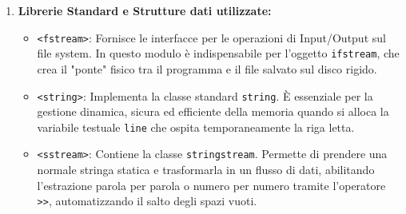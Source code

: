 \documentclass[12pt, a4paper]{article}
\begin{document}
\begin{enumerate}
\begin{itemize}
        \item[-] Sostituzione dinamica dei delimitatori testuali \texttt{|} con spazi bianchi nella seconda parola (\texttt{sequenza\_as}) tramite l'algoritmo \texttt{replace}, preparando la stringa per la successiva estrazione numerica diretta.
        \item[-] Usando nuovamente un oggetto \texttt{stringstream ss\_numeri(sequenza\_as)}, si trasforma la seconda parola modificata in un nuovo stream per leggere la sequenza degli AS.
        \item[-] Inizializzazione delle variabili intere $u$ e $v$. Queste sono utilizzate per mantenere in memoria due numeri consecutivi durante la lettura. La variabile $u$ viene inizializzata a -1 per indicare che non è ancora stata completata la lettura della prima coppia.
        \item[-] Lettura sequenziale dei numeri tramite l'operatore \texttt{>>} all'interno del ciclo \texttt{while (ss\_numeri >> v)}, salvando il valore estratto in $v$. Successivamente si verifica che $u$ sia diverso da -1 e che $u$ e $v$ siano tra loro diversi (per prevenire i self-loop). Se le condizioni sono soddisfatte, l'arco $(u, v)$ viene inserito nel Grafo. Infine, si pone $u = v$ per passare alla coppia di valori successiva.
        \item[-] Chiusura del file al termine della scansione tramite il metodo \texttt{file.close()}.
    \end{itemize}
    \item \textbf{Librerie Standard e Strutture dati utilizzate:}
    \begin{itemize}
        \item[-] \texttt{<fstream>}: Fornisce le interfacce per le operazioni di Input/Output sul file system. In questo modulo è indispensabile per l'oggetto \texttt{ifstream}, che crea il "ponte" fisico tra il programma e il file salvato sul disco rigido.
        \item[-] \texttt{<string>}: Implementa la classe standard \texttt{string}. È essenziale per la gestione dinamica, sicura ed efficiente della memoria quando si alloca la variabile testuale \texttt{line} che ospita temporaneamente la riga letta.
        \item[-] \texttt{<sstream>}: Contiene la classe \texttt{stringstream}. Permette di prendere una normale stringa statica e trasformarla in un flusso di dati, abilitando l'estrazione parola per parola o numero per numero tramite l'operatore \texttt{>>}, automatizzando il salto degli spazi vuoti.

\end{itemize}
\end{enumerate}
\end{document}
